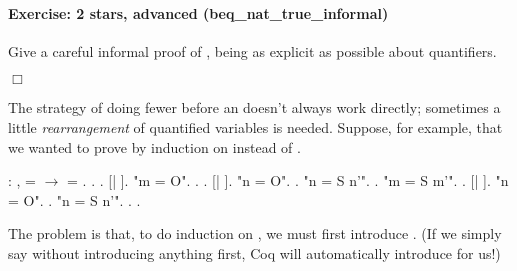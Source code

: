 \documentclass[12pt]{report}
\begin{document}
\paragraph{Exercise: 2 stars, advanced (beq\_nat\_true\_informal)}

 Give a careful informal proof of , being as explicit
    as possible about quantifiers. \begin{coqdoccode}
\coqdocemptyline
\end{coqdoccode}
\ensuremath{\Box} 

 The strategy of doing fewer  before an  doesn't
    always work directly; sometimes a little \textit{rearrangement} of
    quantified variables is needed.  Suppose, for example, that we
    wanted to prove  by induction on  instead of
    . \begin{coqdoccode}
\coqdocemptyline
\coqdocnoindent
{}  : \coqdockw{\ensuremath{\forall}}  ,\coqdoceol
\coqdocindent{2.50em}
  =   \ensuremath{\rightarrow}\coqdoceol
\coqdocindent{2.50em}
 = .\coqdoceol
\coqdocnoindent
{}.\coqdoceol
\coqdocindent{1.00em}
  .    [| ].\coqdoceol
\coqdocindent{1.00em}
 "m = O". .  .    [| ].\coqdoceol
\coqdocindent{2.00em}
 "n = O". .\coqdoceol
\coqdocindent{2.00em}
 "n = S n'".  .\coqdoceol
\coqdocindent{1.00em}
 "m = S m'".  .    [| ].\coqdoceol
\coqdocindent{2.00em}
 "n = O".  .\coqdoceol
\coqdocindent{2.00em}
 "n = S n'".  .\coqdoceol
\coqdocnoindent
{}.\coqdoceol
\coqdocemptyline
\end{coqdoccode}
The problem is that, to do induction on , we must first
    introduce .  (If we simply say   without
    introducing anything first, Coq will automatically introduce
     for us!)   
\end{document}
